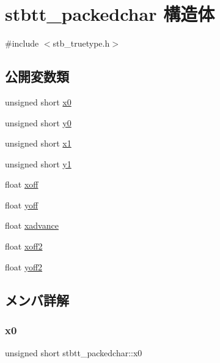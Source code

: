 \hypertarget{structstbtt__packedchar}{}\section{stbtt\+\_\+packedchar 構造体}
\label{structstbtt__packedchar}


{\ttfamily \#include $<$stb\+\_\+truetype.\+h$>$}

\subsection*{公開変数類}
\begin{DoxyCompactItemize}
\item 
unsigned short \mbox{\hyperlink{structstbtt__packedchar_a02cb73a5af37ed60dafd5e4b731af09e}{x0}}
\item 
unsigned short \mbox{\hyperlink{structstbtt__packedchar_a43429c9545ca8ccf14012cedcf83c1a7}{y0}}
\item 
unsigned short \mbox{\hyperlink{structstbtt__packedchar_a99d371f0261cd13dfd1a179f143175d1}{x1}}
\item 
unsigned short \mbox{\hyperlink{structstbtt__packedchar_a9569073ba79fad355210b6ffc35905a7}{y1}}
\item 
float \mbox{\hyperlink{structstbtt__packedchar_adb30c50674c79d32116ae6f94bd5893f}{xoff}}
\item 
float \mbox{\hyperlink{structstbtt__packedchar_a6f342ae10df5319f4999ffd256567142}{yoff}}
\item 
float \mbox{\hyperlink{structstbtt__packedchar_a28707ae98d1fa946b3390840aeff76ab}{xadvance}}
\item 
float \mbox{\hyperlink{structstbtt__packedchar_a3a33880f925ca826c908cbf9f0673c9f}{xoff2}}
\item 
float \mbox{\hyperlink{structstbtt__packedchar_a2ec5bbd1010c9a9b7cbdeb7503dcaffa}{yoff2}}
\end{DoxyCompactItemize}


\subsection{メンバ詳解}
\mbox{\label{structstbtt__packedchar_a02cb73a5af37ed60dafd5e4b731af09e}} 
\subsubsection{\texorpdfstring{x0}{x0}}
{\footnotesize\ttfamily unsigned short stbtt\+\_\+packedchar\+::x0}

